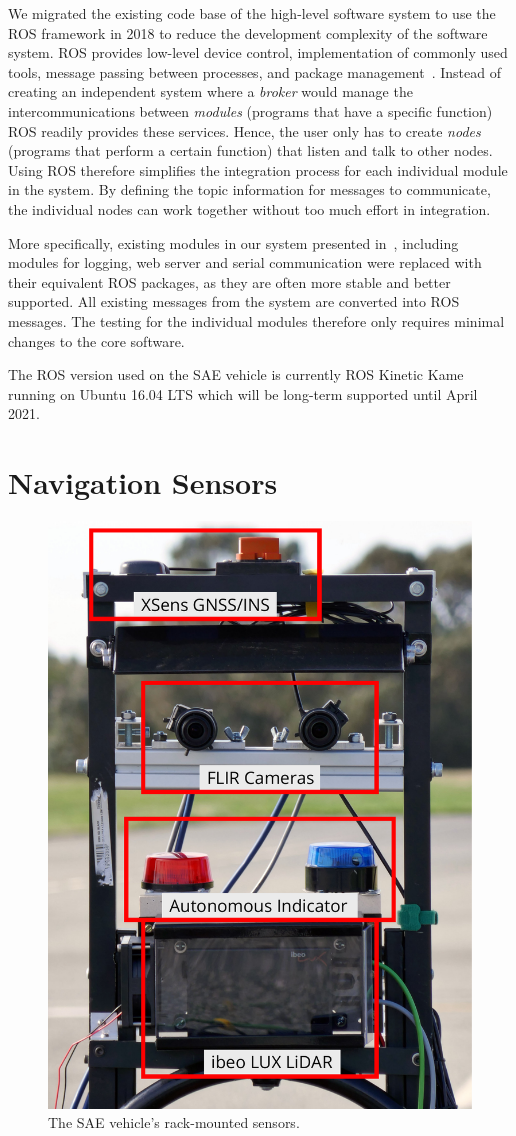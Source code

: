 We migrated the existing code base of the high-level software system to use the ROS framework in 2018 to reduce the development complexity of the software system. ROS provides low-level device control, implementation of commonly used tools, message passing between processes, and package management~\cite{open_source_robotics_foundation_ros/introduction_nodate}. Instead of creating an independent system where a \textit{broker} would manage the intercommunications between \textit{modules} (programs that have a specific function) ROS readily provides these services. Hence, the user only has to create \textit{nodes} (programs that perform a certain function) that listen and talk to other nodes. Using ROS therefore simplifies the integration process for each individual module in the system. By defining the topic information for messages to communicate, the individual nodes can work together without too much effort in integration. 

More specifically, existing modules in our system presented in~\cite{lim_modular_2018}, including modules for logging, web server and serial communication were replaced with their equivalent ROS packages, as they are often more stable and better supported. All existing messages from the system are converted into ROS messages. The testing for the individual modules therefore only requires minimal changes to the core software.

The ROS version used on the SAE vehicle is currently ROS Kinetic Kame running on Ubuntu 16.04 LTS which will be long-term supported until April 2021.

\section{Navigation Sensors}\label{sec:7:sensors}

\begin{figure}[H]
	\centering
	\includegraphics[width=0.45\linewidth]{sensorrack}
	\caption{The SAE vehicle's rack-mounted sensors.}
	\label{fig:7:rack}
\end{figure}

